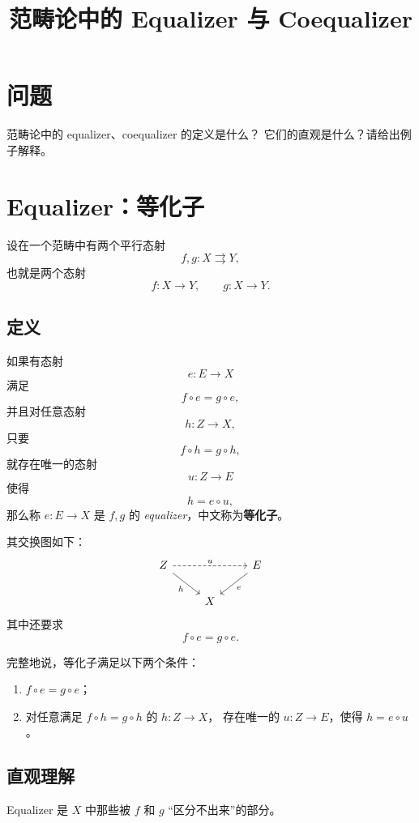 \documentclass[UTF8, a4paper, 12pt]{ctexart}
\title{范畴论中的 Equalizer 与 Coequalizer}
\author{}
\date{}
\begin{document}
\maketitle

\section*{问题}

范畴论中的 equalizer、coequalizer 的定义是什么？
它们的直观是什么？请给出例子解释。

\section{Equalizer：等化子}

设在一个范畴中有两个平行态射
\[
f,g\colon X\rightrightarrows Y,
\]
也就是两个态射
\[
f\colon X\to Y,\qquad g\colon X\to Y.
\]

\subsection{定义}

如果有态射
\[
e\colon E\to X
\]
满足
\[
f\circ e=g\circ e,
\]
并且对任意态射
\[
h\colon Z\to X,
\]
只要
\[
f\circ h=g\circ h,
\]
就存在唯一的态射
\[
u\colon Z\to E
\]
使得
\[
h=e\circ u,
\]
那么称 \(e\colon E\to X\) 是 \(f,g\) 的
\emph{equalizer}，中文称为\textbf{等化子}。

其交换图如下：
\[
\begin{tikzcd}
Z \arrow[rr, "u", dashed] \arrow[dr, "h"'] &&
E \arrow[dl, "e"] \\
& X &
\end{tikzcd}
\]
其中还要求
\[
f\circ e=g\circ e.
\]

完整地说，等化子满足以下两个条件：

\begin{enumerate}[label=\arabic*.]
    \item \(f\circ e=g\circ e\)；
    \item 对任意满足 \(f\circ h=g\circ h\) 的 \(h\colon Z\to X\)，
    存在唯一的 \(u\colon Z\to E\)，使得 \(h=e\circ u\)。
\end{enumerate}

\subsection{直观理解}

Equalizer 是 \(X\) 中那些被 \(f\) 和 \(g\) ``区分不出来''的部分。
\end{document}
